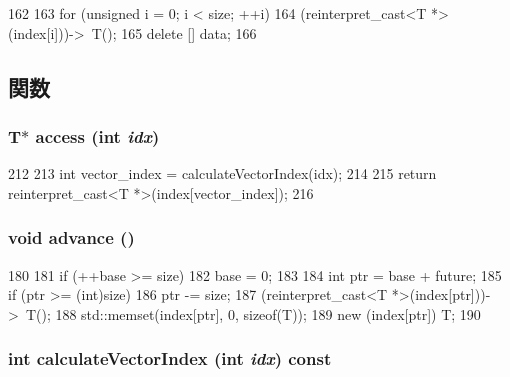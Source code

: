 \begin{DoxyCode}
162     {
163         for (unsigned i = 0; i < size; ++i)
164             (reinterpret_cast<T *>(index[i]))->~T();
165         delete [] data;
166     }
\end{DoxyCode}


\subsection{関数}
\hypertarget{classTimeBuffer_a2c53cc1d80866083c0c997a6d685264a}{
\subsubsection[{access}]{\setlength{\rightskip}{0pt plus 5cm}T$\ast$ access (int {\em idx})}}
\label{classTimeBuffer_a2c53cc1d80866083c0c997a6d685264a}



\begin{DoxyCode}
212     {
213         int vector_index = calculateVectorIndex(idx);
214 
215         return reinterpret_cast<T *>(index[vector_index]);
216     }
\end{DoxyCode}
\hypertarget{classTimeBuffer_a8903a4e9f3d5fb42d0faa9d53e21d85c}{
\subsubsection[{advance}]{\setlength{\rightskip}{0pt plus 5cm}void advance ()}}
\label{classTimeBuffer_a8903a4e9f3d5fb42d0faa9d53e21d85c}



\begin{DoxyCode}
180     {
181         if (++base >= size)
182             base = 0;
183 
184         int ptr = base + future;
185         if (ptr >= (int)size)
186             ptr -= size;
187         (reinterpret_cast<T *>(index[ptr]))->~T();
188         std::memset(index[ptr], 0, sizeof(T));
189         new (index[ptr]) T;
190     }
\end{DoxyCode}
\hypertarget{classTimeBuffer_aed7b39afc8e836689841052a53d78662}{
\subsubsection[{calculateVectorIndex}]{\setlength{\rightskip}{0pt plus 5cm}int calculateVectorIndex (int {\em idx}) const}}
\label{classTimeBuffer_aed7b39afc8e836689841052a53d78662}



